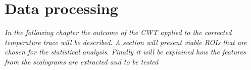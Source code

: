 \chapter{Data processing}
\textit{In the following chapter the outcome of the CWT applied to the corrected temperature trace will be described. A section will present viable ROIs that are chosen for the statistical analysis. Finally it will be explained how the features from the scalograms are extracted and to be tested } 
